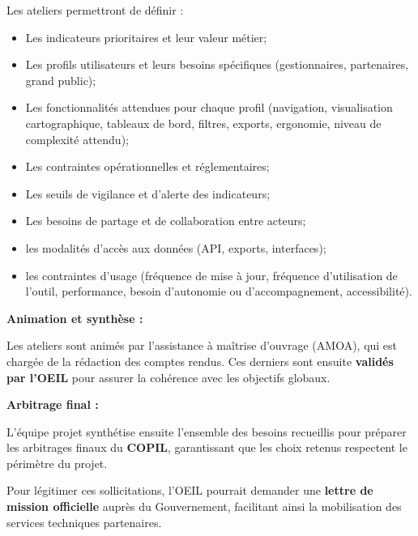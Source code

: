 \documentclass[
  french,
  11pt,
]{article}
\providecommand{\tightlist}{%
  \setlength{\itemsep}{0pt}\setlength{\parskip}{0pt}}
\begin{document}
Les ateliers permettront de définir :

\begin{itemize}
\tightlist
\item
  Les indicateurs prioritaires et leur valeur métier;
\item
  Les profils utilisateurs et leurs besoins spécifiques (gestionnaires,
  partenaires, grand public);
\item
  Les fonctionnalités attendues pour chaque profil (navigation,
  visualisation cartographique, tableaux de bord, filtres, exports,
  ergonomie, niveau de complexité attendu);
\item
  Les contraintes opérationnelles et réglementaires;
\item
  Les seuils de vigilance et d'alerte des indicateurs;
\item
  Les besoins de partage et de collaboration entre acteurs;
\item
  les modalités d'accès aux données (API, exports, interfaces);
\item
  les contraintes d'usage (fréquence de mise à jour, fréquence
  d'utilisation de l'outil, performance, besoin d'autonomie ou
  d'accompagnement, accessibilité).
\end{itemize}

\textbf{Animation et synthèse :}

Les ateliers sont animés par l'assistance à maîtrise d'ouvrage (AMOA),
qui est chargée de la rédaction des comptes rendus. Ces derniers sont
ensuite \textbf{validés par l'OEIL} pour assurer la cohérence avec les
objectifs globaux.

\textbf{Arbitrage final :}

L'équipe projet synthétise ensuite l'ensemble des besoins recueillis
pour préparer les arbitrages finaux du \textbf{COPIL}, garantissant que
les choix retenus respectent le périmètre du projet.

Pour légitimer ces sollicitations, l'OEIL pourrait demander une
\textbf{lettre de mission officielle} auprès du Gouvernement, facilitant
ainsi la mobilisation des services techniques partenaires.
\end{document}
